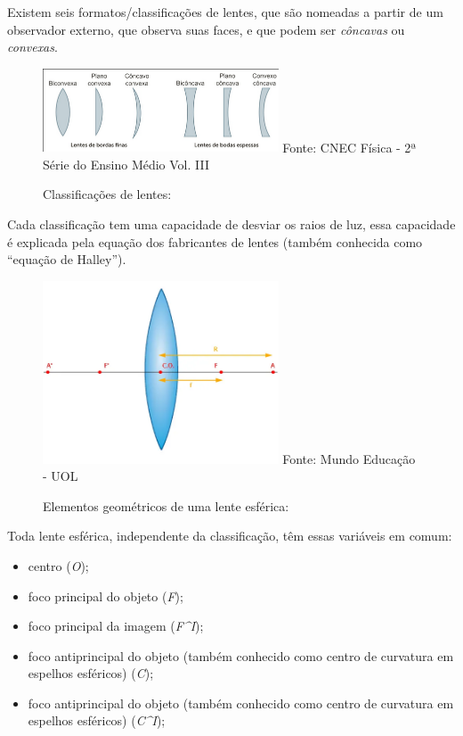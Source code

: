 \documentclass[
  a4paper]{article}
\providecommand{\tightlist}{%
  \setlength{\itemsep}{0pt}\setlength{\parskip}{0pt}}
\begin{document}
Existem seis formatos/classificações de lentes, que são nomeadas a
partir de um observador externo, que observa suas faces, e que podem ser
\emph{côncavas} ou \emph{convexas}.

\begin{figure}[!h]
\centering
    \caption{Classificações de lentes:} 
    \includegraphics[width=70mm]{../_img/classificacoes_lentes_esfericas.png}
    \linebreak
        Fonte: CNEC Física - 2ª Série do Ensino Médio Vol. III 
\end{figure}

Cada classificação tem uma capacidade de desviar os raios de luz, essa
capacidade é explicada pela equação dos fabricantes de lentes (também
conhecida como ``equação de Halley'').

\begin{figure}[!h]
\centering
    \caption{Elementos geométricos de uma lente esférica:} 
    \includegraphics[width=70mm]{../_img/elementos-geometricos.png}
    \linebreak
        Fonte: Mundo Educação - UOL 
\end{figure}

Toda lente esférica, independente da classificação, têm essas variáveis
em comum:

\begin{itemize}
\tightlist
\item
  centro (\emph{O});
\item
  foco principal do objeto (\emph{F});
\item
  foco principal da imagem (\emph{F\^{}I});
\item
  foco antiprincipal do objeto (também conhecido como centro de
  curvatura em espelhos esféricos) (\emph{C});
\item
  foco antiprincipal do objeto (também conhecido como centro de
  curvatura em espelhos esféricos) (\emph{C\^{}I});
\end{itemize}
\end{document}
